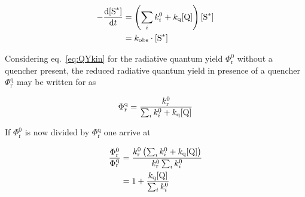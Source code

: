 	\begin{equation}
	\begin{split}
		-\frac{\mathrm{d}[\ce{S^\ast}]}{\mathrm{d}t} &= \left(\sum_i k^0_i + k_\mathrm{q}[\ce{Q}] \right)[\ce{S^\ast}] \\
		&= k_\mathrm{obs}\cdot[\ce{S^\ast}]
	\end{split}
	\end{equation}

	Considering eq.~\ref{eq:QYkin} for the radiative quantum yield $\Phi^0_\mathrm{r}$ without a quencher present, the reduced radiative quantum yield in presence of a quencher $\Phi^\mathrm{q}_\mathrm{r}$ may be written for  as

	\begin{equation}
		\Phi^\mathrm{q}_\mathrm{r} = \frac{k^0_\mathrm{r}}{\sum_i k^0_i + k_\mathrm{q}\ce{[Q]}}
	\end{equation}

	If $\Phi^0_\mathrm{r}$ is now divided by $\Phi^\mathrm{q}_\mathrm{r}$ one arrive at

	\begin{equation}
	\label{eq:SVderiv}
	\begin{split}
		\frac{\Phi^0_\mathrm{r}}{\Phi^\mathrm{q}_\mathrm{r}} &= \frac{k^0_\mathrm{r}\left(\sum_i k^0_i + k_\mathrm{q}\ce{[Q]} \right)}{k^0_\mathrm{r}\sum_i k^0_i} \\
		&= 1 + \frac{k_\mathrm{q}\ce{[Q]} }{\sum_i k^0_i}
	\end{split}
	\end{equation}

